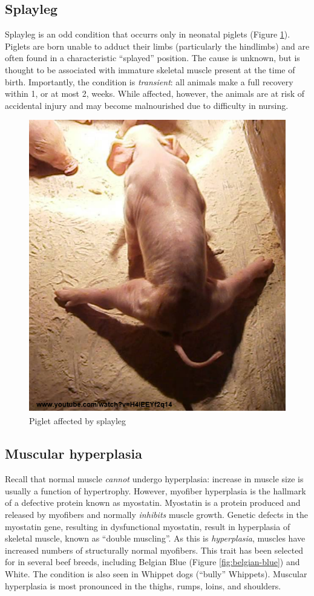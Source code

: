 \documentclass[openany]{book}
\begin{document}
\subsection{Splayleg}\label{splayleg}

Splayleg is an odd condition that occurrs only in neonatal piglets
(Figure \ref{fig:splayleg}). Piglets are born unable to adduct their
limbs (particularly the hindlimbs) and are often found in a
characteristic ``splayed'' position. The cause is unknown, but is
thought to be associated with immature skeletal muscle present at the
time of birth. Importantly, the condition is \emph{transient}: all
animals make a full recovery within 1, or at most 2, weeks. While
affected, however, the animals are at risk of accidental injury and may
become malnourished due to difficulty in nursing.

\begin{figure}

{\centering \includegraphics[width=0.6\linewidth]{images/splayleg} 

}

\caption{Piglet affected by splayleg}\label{fig:splayleg}
\end{figure}

\subsection{Muscular hyperplasia}\label{muscular-hyperplasia}

Recall that normal muscle \emph{cannot} undergo hyperplasia: increase in
muscle size is usually a function of hypertrophy. However, myofiber
hyperplasia is the hallmark of a defective protein known as myostatin.
Myostatin is a protein produced and released by myofibers and normally
\emph{inhibits} muscle growth. Genetic defects in the myostatin gene,
resulting in dysfunctional myostatin, result in hyperplasia of skeletal
muscle, known as ``double muscling''. As this is \emph{hyperplasia},
muscles have increased numbers of structurally normal myofibers. This
trait has been selected for in several beef breeds, including Belgian
Blue (Figure \ref{fig:belgian-blue}) and White. The condition is also
seen in Whippet dogs (``bully'' Whippets). Muscular hyperplasia is most
pronounced in the thighs, rumps, loins, and shoulders.
\end{document}
